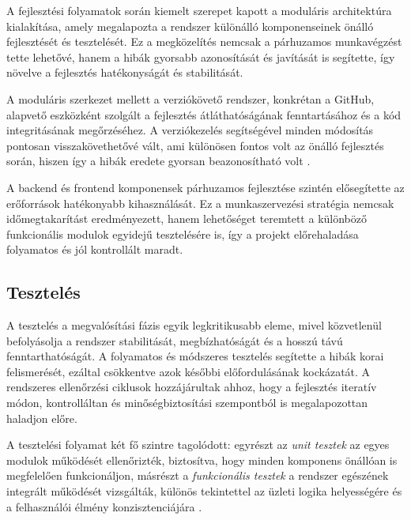 A fejlesztési folyamatok során kiemelt szerepet kapott a moduláris architektúra kialakítása, amely megalapozta a rendszer különálló komponenseinek önálló fejlesztését és tesztelését.  
Ez a megközelítés nemcsak a párhuzamos munkavégzést tette lehetővé, hanem a hibák gyorsabb azonosítását és javítását is segítette, így növelve a fejlesztés hatékonyságát és stabilitását.  

A moduláris szerkezet mellett a verziókövető rendszer, konkrétan a GitHub, alapvető eszközként szolgált a fejlesztés átláthatóságának 
fenntartásához és a kód integritásának megőrzéséhez.  
A verziókezelés segítségével minden módosítás pontosan visszakövethetővé vált, ami különösen fontos volt az önálló fejlesztés során, 
hiszen így a hibák eredete gyorsan beazonosítható volt \cite{Kovacs2016,Kaposi2019}.  

A backend és frontend komponensek párhuzamos fejlesztése szintén elősegítette az erőforrások hatékonyabb kihasználását.  
Ez a munkaszervezési stratégia nemcsak időmegtakarítást eredményezett, hanem lehetőséget teremtett a különböző funkcionális modulok 
egyidejű tesztelésére is, így a projekt előrehaladása folyamatos és jól kontrollált maradt.

\subsection{Tesztelés}

A tesztelés a megvalósítási fázis egyik legkritikusabb eleme, mivel közvetlenül befolyásolja a rendszer stabilitását, megbízhatóságát és a hosszú távú fenntarthatóságát.  
A folyamatos és módszeres tesztelés segítette a hibák korai felismerését, ezáltal csökkentve azok későbbi előfordulásának kockázatát.  
A rendszeres ellenőrzési ciklusok hozzájárultak ahhoz, hogy a fejlesztés iteratív módon, kontrolláltan és minőségbiztosítási szempontból is megalapozottan haladjon előre.  

A tesztelési folyamat két fő szintre tagolódott: egyrészt az \textit{unit tesztek} az egyes modulok működését ellenőrizték, 
biztosítva, hogy minden komponens önállóan is megfelelően funkcionáljon,  
másrészt a \textit{funkcionális tesztek} a rendszer egészének integrált működését vizsgálták, különös tekintettel az üzleti 
logika helyességére és a felhasználói élmény konzisztenciájára \cite{Szalay2018,Hajdu2014}.  

